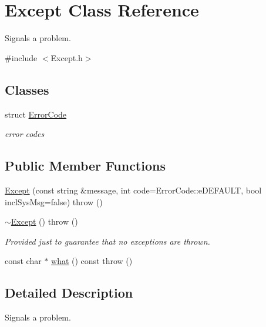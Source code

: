 \hypertarget{classExcept}{
\section{Except Class Reference}
\label{classExcept}
}


Signals a problem.  


{\ttfamily \#include $<$Except.h$>$}\subsection*{Classes}
\begin{DoxyCompactItemize}
\item 
struct \hyperlink{structExcept_1_1ErrorCode}{ErrorCode}
\begin{DoxyCompactList}\small\item\em error codes \item\end{DoxyCompactList}\end{DoxyCompactItemize}
\subsection*{Public Member Functions}
\begin{DoxyCompactItemize}
\item 
\hyperlink{classExcept_a11d3d6f909f2f86f2293f1c6353f2da0}{Except} (const string \&message, int code=ErrorCode::eDEFAULT, bool inclSysMsg=false)  throw ()
\item 
\hypertarget{classExcept_a9965506978c3bbd4c1921b7c75a54e3b}{
\hyperlink{classExcept_a9965506978c3bbd4c1921b7c75a54e3b}{$\sim$Except} ()  throw ()}
\label{classExcept_a9965506978c3bbd4c1921b7c75a54e3b}

\begin{DoxyCompactList}\small\item\em Provided just to guarantee that no exceptions are thrown. \item\end{DoxyCompactList}\item 
const char $\ast$ \hyperlink{classExcept_a33a7e9f297703a8f427046004bf1260b}{what} () const   throw ()
\end{DoxyCompactItemize}


\subsection{Detailed Description}
Signals a problem. 

